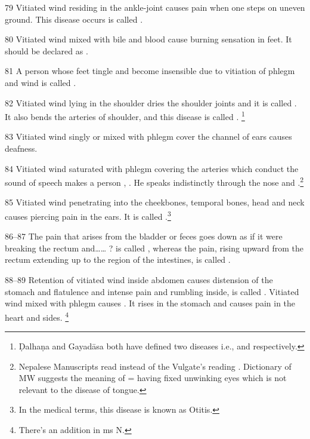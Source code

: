 \begin{translation}
\item[79] Vitiated wind residing in the ankle-joint causes pain when one steps on uneven ground. This disease occurs is called .

\item[80] Vitiated wind mixed with bile and blood cause burning sensation in feet. It should be declared as .

\item[81] A person whose feet tingle and become insensible due to vitiation of phlegm and wind is called .

\item[82] Vitiated wind lying in the shoulder dries the shoulder joints and it is called . It also bends the arteries of shoulder, and this disease is called . \footnote{Ḍalhaṇa and Gayadāsa both have defined two diseases i.e.,  and  respectively.}

\item[83] Vitiated wind singly or mixed with phlegm cover the channel of ears causes deafness.

\item[84] Vitiated wind saturated with phlegm covering the arteries which conduct the sound of speech makes a person , . He speaks indistinctly through the nose and .\footnote{Nepalese Manuscripts read  instead of the Vulgate’s reading . Dictionary of MW suggests the meaning of  = having fixed unwinking eyes which is not relevant to the disease of tongue.}

\item[85] Vitiated wind penetrating into the cheekbones, temporal bones, head and neck causes piercing pain in the ears. It is called .\footnote{In the medical terms, this disease is known as Otitis.}

\item[86--87] The pain that arises from the bladder or feces goes down as if it were breaking the rectum and…… ? is called , whereas the pain, rising upward from the rectum extending up to the region of the intestines, is called .

\item[88--89] Retention of vitiated wind inside abdomen causes distension of the stomach and flatulence and intense pain and rumbling inside, is called . Vitiated wind mixed with phlegm causes . It rises in the stomach and causes pain in the heart and sides. \footnote{There’s an addition in ms N. }


\end{translation}
